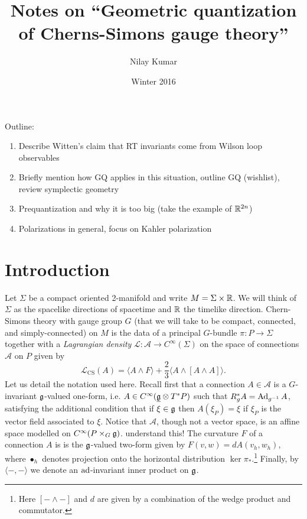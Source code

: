 \documentclass{amsart}
\title{Notes on ``Geometric quantization of Cherns-Simons gauge theory''}
\author{Nilay Kumar}
\date{Winter 2016}
\begin{document}
\maketitle
\tableofcontents

Outline:
\begin{enumerate}
    \item Describe Witten's claim that RT invariants come from Wilson loop observables
    \item Briefly mention how GQ applies in this situation, outline GQ (wishlist), review symplectic geometry
    \item Prequantization and why it is too big (take the example of $\mathbb{R}^{2n}$)
    \item Polarizations in general, focus on Kahler polarization
\end{enumerate}

\section{Introduction}
Let $\Sigma$ be a compact oriented 2-manifold and write $M=\Sigma\times\mathbb{R}$. We will think of $\Sigma$ as the
spacelike directions of spacetime and $\mathbb{R}$ the timelike direction. Chern-Simons theory with gauge
group $G$ (that we will take to be compact, connected, and simply-connected) on $M$ is the data of a principal
$G$-bundle $\pi:P\to\Sigma$ together with a
\textit{Lagrangian density} $\mathscr{L}:\mathscr{A}\to C^\infty(\Sigma)$ on the space of connections $\mathscr{A}$ on $P$
given by
\begin{equation*}
    \mathscr{L}_\text{CS}(A) = \langle A\wedge F\rangle + \frac{2}{3}\langle A\wedge [A\wedge A]\rangle.
\end{equation*}
Let us detail the notation used here. Recall first that a connection $A\in\mathscr{A}$ is
a $G$-invariant $\mathfrak g$-valued one-form, i.e. $A\in C^\infty(\underline{\mathfrak g}\otimes T^*P)$ such that
$R_g^*A = \operatorname{Ad}_{g^{-1}}A$, satisfying the additional condition that if $\xi\in\mathfrak g$ then
$A(\xi_P)=\xi$ if $\xi_P$ is the vector field associated to $\xi$. Notice that $\mathscr{A}$,
though not a vector space, is an affine space modelled on $C^\infty(P\times_G\mathfrak g)$. {\color{red}understand this!}
The curvature $F$ of a connection $A$ is is the $\mathfrak g$-valued two-form given by $F(v,w) = dA(v_h,w_h)$,
where $\bullet_h$ denotes projection onto the horizontal distribution $\ker\pi_*$.\footnote{Here
$[-\wedge-]$ and $d$ are given by a combination of the wedge product and commutator.}
Finally, by $\langle-,-\rangle$ we denote an $\operatorname{ad}$-invariant inner product on $\mathfrak g$.
\end{document}
